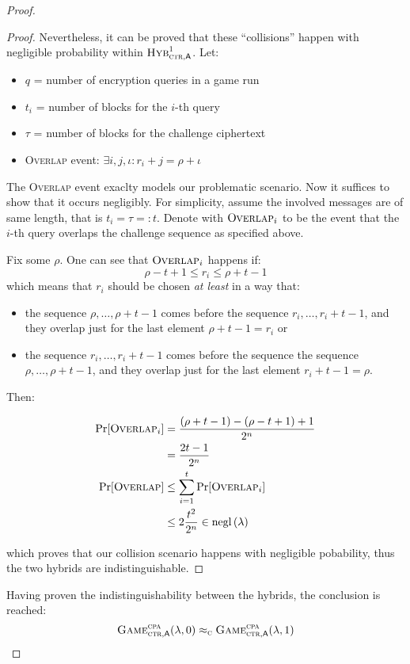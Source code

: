 \begin{proof}
\begin{proof}
        Nevertheless, it can be proved that these ``collisions'' happen with negligible probability within $\hybridg{1}[\textsc{ctr}]$. Let:
        \begin{itemize}
            \item $q$ = number of encryption queries in a game run
            \item $t_i$ = number of blocks for the $i$-th query
            \item $\tau$ = number of blocks for the challenge ciphertext
            \item \textsc{Overlap} event: $\exists i, j, \iota : r_i + j = \rho + \iota$
        \end{itemize}

        The \textsc{Overlap} event exaclty models our problematic scenario. Now it suffices to show that it occurs negligibly. For simplicity, assume the involved messages are of same length, that is $t_i = \tau =: t$. Denote with $\textsc{Overlap}_i$ to be the event that the $i$-th query overlaps the challenge sequence as specified above.

        Fix some $\rho$. One can see that $\textsc{Overlap}_i$ happens if:
        \[
            \rho - t + 1 \leq r_i \leq \rho + t - 1
        \]
        which means that $r_i$ should be chosen \emph{at least} in a way that:
        \begin{itemize}
            \item the sequence $\rho, \dots, \rho + t - 1$ comes before the sequence $r_i, \dots, r_i + t - 1$, and they overlap just for the last element $\rho + t - 1 = r_i$ or
            \item the sequence $r_i, \dots, r_i + t - 1$ comes before the sequence the sequence $\rho, \dots, \rho + t - 1$, and they overlap just for the last element $r_i + t - 1 = \rho$.
        \end{itemize}

        Then:

        \begin{align*}
            \Pr[\textsc{Overlap}_i] &= \frac{(\rho + t - 1) - (\rho - t + 1) + 1}{2^n} \\
            &= \frac{2t-1}{2^n} \\
            \Pr[\textsc{Overlap}] &\leq \sum_{i = 1}^{t} \Pr[\textsc{Overlap}_i] \\
            &\leq 2 \frac{t^2}{2^n} \in \mathrm{negl}\left({\lambda}\right) 
        \end{align*}
            
        which proves that our collision scenario happens with negligible pobability, thus the two hybrids are indistinguishable.

    \end{proof}
    
    Having proven the indistinguishability between the hybrids, the conclusion is reached:
    \[
        \cryptog{cpa}[\textsc{ctr}](\lambda, 0) \compindist \cryptog{cpa}[\textsc{ctr}](\lambda, 1)
    \]
    
\end{proof}
